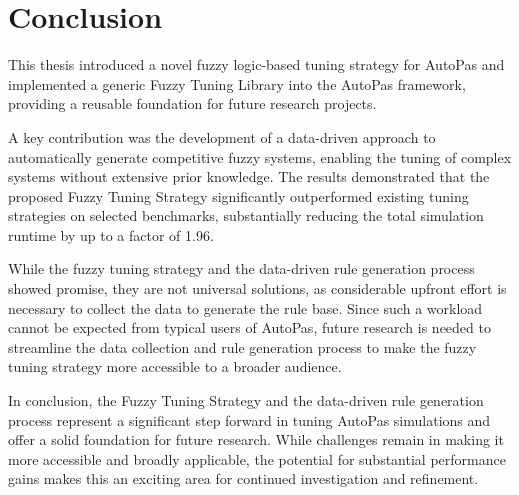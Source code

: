 \chapter{Conclusion}
\label{sec:conclusion}

This thesis introduced a novel fuzzy logic-based tuning strategy for AutoPas and implemented a generic Fuzzy Tuning Library into the AutoPas framework, providing a reusable foundation for future research projects.

\medskip

\noindent A key contribution was the development of a data-driven approach to automatically generate competitive fuzzy systems, enabling the tuning of complex systems without extensive prior knowledge. The results demonstrated that the proposed Fuzzy Tuning Strategy significantly outperformed existing tuning strategies on selected benchmarks, substantially reducing the total simulation runtime by up to a factor of 1.96.

\medskip

\noindent While the fuzzy tuning strategy and the data-driven rule generation process showed promise, they are not universal solutions, as considerable upfront effort is necessary to collect the data to generate the rule base. Since such a workload cannot be expected from typical users of AutoPas, future research is needed to streamline the data collection and rule generation process to make the fuzzy tuning strategy more accessible to a broader audience.

\medskip

\noindent In conclusion, the Fuzzy Tuning Strategy and the data-driven rule generation process represent a significant step forward in tuning AutoPas simulations and offer a solid foundation for future research. While challenges remain in making it more accessible and broadly applicable, the potential for substantial performance gains makes this an exciting area for continued investigation and refinement.